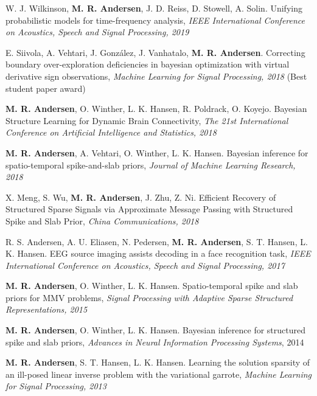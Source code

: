 \documentclass[10pt]{article}
\begin{document}
\begin{bibenum}
\item W. J. Wilkinson, \textbf{M. R. Andersen}, J. D. Reiss, D. Stowell, A. Solin. Unifying probabilistic models for time-frequency analysis, \textit{IEEE International Conference on Acoustics, Speech and Signal Processing, 2019}

\item E. Siivola, A. Vehtari, J. Gonz\'alez, J. Vanhatalo, \textbf{M. R. Andersen}. Correcting boundary over-exploration deficiencies in bayesian optimization with virtual derivative sign observations,  \textit{Machine Learning for Signal Processing, 2018} (Best student paper award)

\item \textbf{M. R. Andersen}, O. Winther, L. K. Hansen, R. Poldrack, O. Koyejo. Bayesian Structure Learning for Dynamic Brain Connectivity, \textit{The 21st International Conference on 
Artificial Intelligence and Statistics, 2018}

\item \textbf{M. R. Andersen}, A. Vehtari, O. Winther, L. K. Hansen. Bayesian inference for spatio-temporal spike-and-slab priors, \textit{Journal of Machine Learning Research, 2018}

\item X. Meng, S. Wu, \textbf{M. R. Andersen}, J. Zhu, Z. Ni. Efficient Recovery of Structured Sparse Signals via Approximate Message Passing with Structured Spike and Slab Prior, \textit{China Communications, 2018}


\item R. S. Andersen, A. U. Eliasen, N. Pedersen, \textbf{M. R. Andersen}, S. T. Hansen, L. K. Hansen. EEG source imaging assists decoding in a face recognition task, \textit{IEEE International Conference on Acoustics, Speech and Signal Processing, 2017}

\item \textbf{M. R. Andersen},  O. Winther, L. K. Hansen. Spatio-temporal spike and slab priors for MMV problems, \textit{Signal Processing with Adaptive Sparse Structured Representations, 2015}

\item \textbf{M. R. Andersen}, O. Winther, L. K. Hansen. Bayesian inference for structured spike and slab priors, \textit{Advances in Neural Information Processing Systems}, 2014

\item \textbf{M. R. Andersen}, S. T. Hansen, L. K. Hansen. Learning the solution sparsity of an ill-posed linear inverse problem with the variational garrote, \textit{Machine Learning for Signal Processing, 2013}


\end{bibenum}
\end{document}
